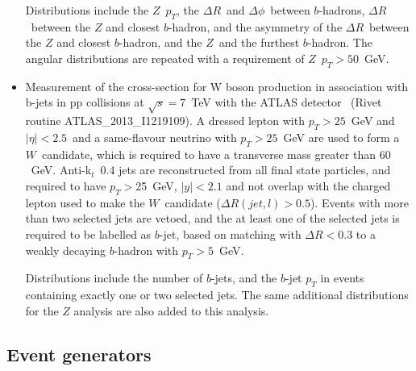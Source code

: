 \documentclass[11pt]{cernrep}
\newcommand{\pt}{\ensuremath{p_{T}}\xspace}
\begin{document}
\begin{itemize}
  Distributions include the $Z$\ \pt, the $\Delta R$\ and
  $\Delta\phi$\ between $b$-hadrons, $\Delta R$\ between the $Z$ and closest
  $b$-hadron, and the asymmetry of the $\Delta R$\ between the $Z$ and
  closest $b$-hadron, and the $Z$\ and the furthest $b$-hadron. The angular
  distributions are repeated with a requirement of $Z$\ $\pt>50$~GeV.

\item Measurement of the cross-section for W boson production in association
  with b-jets in pp collisions at $\sqrt{s} = 7$~TeV with the ATLAS
  detector~\cite{Aad:2013vka} (Rivet routine ATLAS\_2013\_I1219109). A
  dressed lepton with $\pt>25$~GeV and $|\eta|<2.5$\ and a same-flavour
  neutrino with $\pt>25$~GeV are used to form a $W$~candidate, which is
  required to have a transverse mass greater than $60$~GeV. Anti-k$_{t}$\ 0.4
  jets are reconstructed from all final state particles, and required to have
  $\pt>$25~GeV, $|y|<2.1$ and not overlap with the charged lepton used to
  make the $W$~candidate ($\Delta R(jet, l)> 0.5$). Events with more than two
  selected jets are vetoed, and the at least one of the selected jets is
  required to be labelled as $b$-jet, based on matching with $\Delta R<0.3$
  to a weakly decaying $b$-hadron with $\pt>5$~GeV.

  Distributions include the number of $b$-jets, and the $b$-jet \pt in events
  containing exactly one or two selected jets. The same additional
  distributions for the $Z$ analysis are also added to this analysis.
  

\end{itemize}

\subsection{Event generators \label{generators}}
\end{document}
